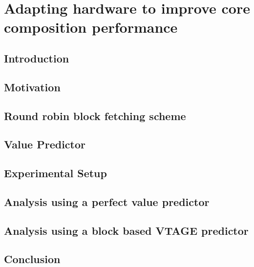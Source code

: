 \chapter{Adapting hardware to improve core composition performance}

\section{Introduction}\label{sect:introduction-chapter3}

\section{Motivation}\label{sect:ch3-motivation}

\section{Round robin block fetching scheme}\label{chp3:sec:fetch}

\section{Value Predictor}
\label{chp3:sec:val}
\section{Experimental Setup}
\label{chp:chp3:sec:exp}
\section{Analysis using a perfect value predictor}
\label{chp:chp3:sec:analysis}
\section{Analysis using a block based VTAGE predictor}
\label{chp:chp3:sec:analysis2}
\section{Conclusion}

%
%